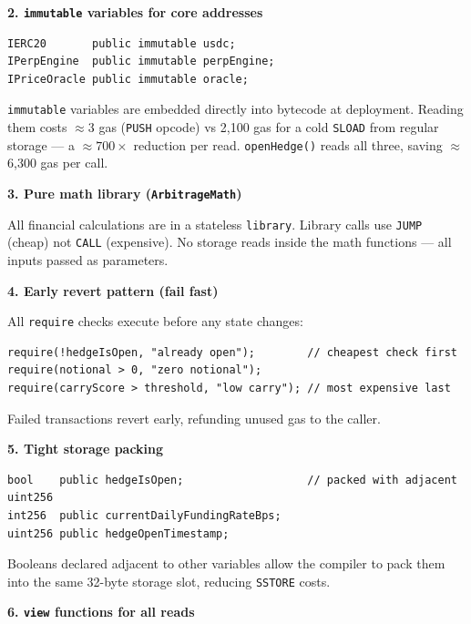 \documentclass[11pt,a4paper]{article}
\begin{document}
\textbf{2. \texttt{immutable} variables for core addresses}

\begin{lstlisting}[style=solidity, caption={\texttt{immutable} state variables in \texttt{StrategyVault}.}]
IERC20       public immutable usdc;
IPerpEngine  public immutable perpEngine;
IPriceOracle public immutable oracle;
\end{lstlisting}

\texttt{immutable} variables are embedded directly into bytecode at deployment. Reading them costs $\approx$3 gas (\texttt{PUSH} opcode) vs 2,100 gas for a cold \texttt{SLOAD} from regular storage --- a $\approx700\times$ reduction per read. \texttt{openHedge()} reads all three, saving $\approx$6,300 gas per call.

\textbf{3. Pure math library (\texttt{ArbitrageMath})}

All financial calculations are in a stateless \texttt{library}. Library calls use \texttt{JUMP} (cheap) not \texttt{CALL} (expensive). No storage reads inside the math functions --- all inputs passed as parameters.

\textbf{4. Early revert pattern (fail fast)}

All \texttt{require} checks execute before any state changes:

\begin{lstlisting}[style=solidity, caption={Early-revert ordering in \texttt{openHedge()}.}]
require(!hedgeIsOpen, "already open");        // cheapest check first
require(notional > 0, "zero notional");
require(carryScore > threshold, "low carry"); // most expensive last
\end{lstlisting}

Failed transactions revert early, refunding unused gas to the caller.

\textbf{5. Tight storage packing}

\begin{lstlisting}[style=solidity, caption={Adjacent bool for storage packing.}]
bool    public hedgeIsOpen;                   // packed with adjacent uint256
int256  public currentDailyFundingRateBps;
uint256 public hedgeOpenTimestamp;
\end{lstlisting}

Booleans declared adjacent to other variables allow the compiler to pack them into the same 32-byte storage slot, reducing \texttt{SSTORE} costs.

\textbf{6. \texttt{view} functions for all reads}
\end{document}
